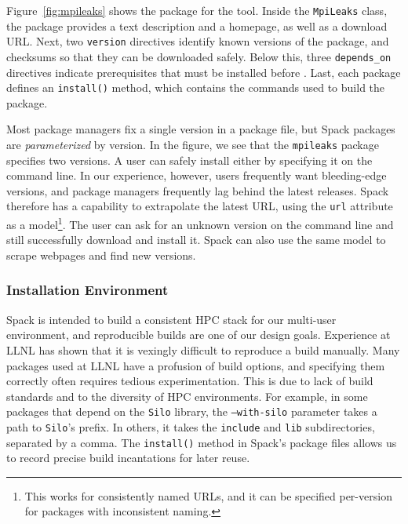 Figure~\ref{fig:mpileaks} shows the package for the \mpileaks tool.
Inside the {\tt MpiLeaks} class, the package provides a text description
and a homepage, as well as 
a download URL.  Next, two {\tt version} directives identify known versions
of the package, and checksums so that they can be downloaded safely.
Below this, three {\tt depends\_on}
directives indicate prerequisites that must be installed before \mpileaks.
Last, each package defines an {\tt install()} method, which contains the
commands used to build the package.

Most package managers fix a single version in a package file, but Spack packages
are {\it parameterized} by version.  In the figure, we see that the {\tt mpileaks}
package specifies two versions.  A user can safely install either by 
specifying it on the command line.  In our experience, however, users
frequently want bleeding-edge versions, and package managers frequently lag 
behind the latest releases.  Spack therefore has a capability to extrapolate
the latest URL, using the {\tt url} attribute as a model\footnote{This works
for consistently named URLs, and it can be specified per-version for packages
with inconsistent naming.}.
The user can ask for an unknown version on the command line and still
successfully download and install it.  Spack can also use the same model to
scrape webpages and find new versions. 

\subsubsection{Installation Environment}

Spack is intended to build a consistent HPC stack for our multi-user
environment, and reproducible builds are one of our design goals.
Experience at LLNL has shown that it is vexingly difficult to reproduce
a build manually.
%
Many packages used at LLNL have a profusion of build options, and specifying them 
correctly often requires tedious experimentation.  This is due to lack of
build standards and to the diversity of HPC environments.  
For example, in some packages that depend on the {\tt Silo} library,
the {\tt ---with-silo} parameter takes a path to {\tt Silo}'s prefix.
In others, it takes the {\tt include} and {\tt lib} subdirectories,
separated by a comma.
The {\tt install()} method in Spack's package files allows us to record
precise build incantations for later reuse.


